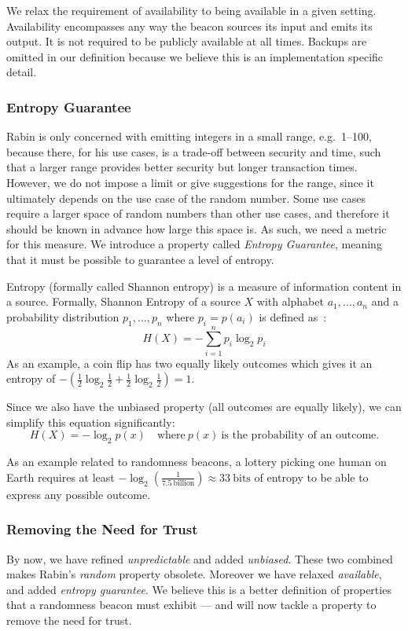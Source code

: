 We relax the requirement of availability to being available in a given setting.
Availability encompasses any way the beacon sources its input and emits its output.
It is not required to be publicly available at all times.
Backups are omitted in our definition because we believe this is an implementation specific detail.

\subsubsection{Entropy Guarantee}
Rabin is only concerned with emitting integers in a small range, e.g.\ 1--100, because there, for his use cases, is a trade-off between security and time, such that a larger range provides better security but longer transaction times.
However, we do not impose a limit or give suggestions for the range, since it ultimately depends on the use case of the random number.
Some use cases require a larger space of random numbers than other use cases, and therefore it should be known in advance how large this space is.
As such, we need a metric for this measure.
We introduce a property called \emph{Entropy Guarantee}, meaning that it must be possible to guarantee a level of entropy.

Entropy (formally called Shannon entropy) is a measure of information content in a source.
Formally, Shannon Entropy of a source $X$ with alphabet ${a_1, \ldots, a_n}$ and a probability distribution ${p_1, \ldots , p_n}$ where $p_i = p(a_i)$ is defined as~\cite{informationtheory}:
\[
H(X) = -\sum\limits_{i = 1}^n p_{i}\log_{2} p_{i}
\]
As an example, a coin flip has two equally likely outcomes which gives it an entropy of $-\left(\frac{1}{2}\log_2 \frac{1}{2} + \frac{1}{2}\log_2 \frac{1}{2}\right) = 1$.

Since we also have the unbiased property (all outcomes are equally likely), we can simplify this equation significantly:
\[
    H(X) = -\log_{2}p(x) \quad\text{where}\ p(x) \ \text{is the probability of an outcome.}
\]

As an example related to randomness beacons, a lottery picking one human on Earth requires at least $-\log_2\left(\frac{1}{7.5~\text{billion}}\right) \approx 33~\text{bits}$ of entropy to be able to express any possible outcome.

\subsubsection{Removing the Need for Trust}
By now, we have refined \emph{unpredictable} and added \emph{unbiased}.
These two combined makes Rabin's \emph{random} property obsolete.
Moreover we have relaxed \emph{available}, and added \emph{entropy guarantee}.
We believe this is a better definition of properties that a randomness beacon must exhibit --- and will now tackle a property to remove the need for trust.

